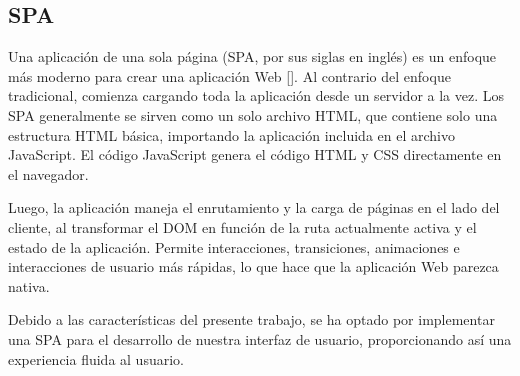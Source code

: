 \subsection{SPA}
Una aplicación de una sola página (SPA, por sus siglas en inglés) es un enfoque más moderno para crear una aplicación Web [\cite{101}]. Al contrario del enfoque tradicional, comienza cargando toda la aplicación desde un servidor a la vez. Los SPA generalmente se sirven como un solo archivo HTML, que contiene solo una estructura HTML básica, importando la aplicación incluida en el archivo JavaScript. El código JavaScript genera el código HTML y CSS directamente en el navegador.

Luego, la aplicación maneja el enrutamiento y la carga de páginas en el lado del cliente, al transformar el DOM en función de la ruta actualmente activa y el estado de la aplicación. Permite interacciones, transiciones, animaciones e interacciones de usuario más rápidas, lo que hace que la aplicación Web parezca nativa.

Debido a las características del presente trabajo, se ha optado por implementar una SPA para el desarrollo de nuestra interfaz de usuario, proporcionando así una experiencia fluida al usuario. %

%
%

